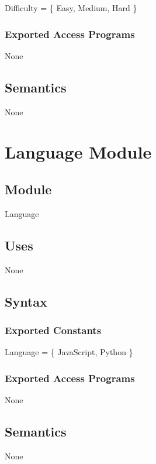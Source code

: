 \documentclass[12pt, titlepage]{article}
\begin{document}
Difficulty = \{
    Easy,
    Medium,
    Hard
\}

\subsubsection{Exported Access Programs}
None


\subsection{Semantics}

None



\newpage

\section{Language Module} \label{Language} 

\subsection{Module}

Language

\subsection{Uses}

None


\subsection{Syntax}

\subsubsection{Exported Constants}

Language = \{ JavaScript, Python \}

\subsubsection{Exported Access Programs}
None


\subsection{Semantics}

None



\newpage
\end{document}
